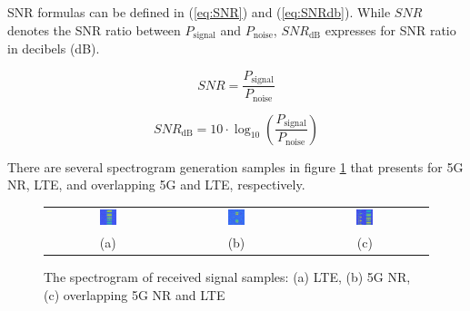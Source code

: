 \documentclass[journal]{IEEEtran} %
\begin{document}
\indent SNR formulas can be defined in (\ref{eq:SNR}) and (\ref{eq:SNRdb}). While \(SNR\) denotes the SNR ratio between \(P_{\text{signal}}\) and \(P_{\text{noise}}\), \(SNR_{\text{dB}}\) expresses for SNR ratio in decibels (dB).

\begin{equation}
    SNR = \frac{P_{\text{signal}}}{P_{\text{noise}}}    
    \label{eq:SNR}
\end{equation}

\begin{equation}
    SNR_{\text{dB}} = 10 \cdot \log_{10} \left( \frac{P_{\text{signal}}}{P_{\text{noise}}} \right)
    \label{eq:SNRdb}
\end{equation}

\indent There are several spectrogram generation samples in figure \ref{fig2} that presents for 5G NR, LTE, and overlapping 5G and LTE, respectively.

\begin{figure}[!h]
    \centering
    \footnotesize
    \begin{tabular}{ccc}
        \includegraphics[width=0.14\textwidth]{img/LTE_frame_0.png} & \includegraphics[width=0.14\textwidth]{img/NR_frame_1506.png} &
        \includegraphics[width=0.14\textwidth]{img/LTE_NR_frame_0.png} & \\
        (a) & (b) & (c)
    \end{tabular}
    \caption{The spectrogram of received signal samples: (a) LTE, (b) 5G NR, (c) overlapping 5G NR and LTE}
    \label{fig2}
\end{figure}
\end{document}
